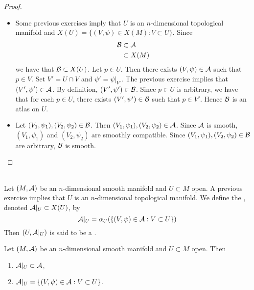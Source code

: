 \documentclass{book}
\begin{document}
\begin{proof}\
	\begin{itemize}
		\item Some previous exercises imply that $U$ is an $n$-dimensional topological manifold and $X(U) = \{(V, \psi) \in X(M): V \subset U\}$. Since 
		\begin{align*}
			\mathcal{B} 
			& \subset \mathcal{A} \\
			& \subset X(M)
		\end{align*}
		we have that $\mathcal{B} \subset X(U)$. Let $p \in U$. Then there exists $(V, \psi) \in \mathcal{A}$ such that $p \in V$. Set $V' = U \cap V$ and $\psi' = \psi|_{V'}$. The previous exercise implies that $(V', \psi') \in \mathcal{A}$. By definition, $(V', \psi') \in \mathcal{B}$. Since $p \in U$ is arbitrary, we have that for each $p \in U$, there exists $(V', \psi') \in \mathcal{B}$ such that $p \in V'$. Hence $\mathcal{B}$ is an atlas on $U$. 
		\item Let $(V_1, \psi_1), (V_2, \psi_2) \in \mathcal{B}$. Then $(V_1, \psi_1), (V_2, \psi_2) \in \mathcal{A}$. Since $\mathcal{A}$ is smooth, $(V_1, \psi_1)$ and $(V_2, \psi_2)$ are smoothly compatible. Since $(V_1, \psi_1), (V_2, \psi_2) \in \mathcal{B}$ are arbitrary, $\mathcal{B}$ is smooth.
	\end{itemize}
\end{proof}

\begin{defn}   \\
	Let $(M, \mathcal{A})$ be an $n$-dimensional smooth manifold and $U \subset M$ open. A previous exercise implies that $U$ is an $n$-dimensional topological manifold. We define the , denoted $\mathcal{A}|_{U} \subset X(U)$, by 
	$$\mathcal{A}|_{U} = \alpha_U(\{(V, \psi) \in \mathcal{A}: V \subset U\})$$
	Then $(U, \mathcal{A}|_{U})$ is said to be a .
\end{defn}

\begin{ex} 
	Let $(M, \mathcal{A})$ be an $n$-dimensional smooth manifold and $U \subset M$ open. Then 
	\begin{enumerate}
		\item $\mathcal{A}|_U \subset \mathcal{A}$,
		\item $\mathcal{A}|_U = \{(V, \psi) \in \mathcal{A}: V \subset U\}$.
	\end{enumerate}
\end{ex}
\end{document}
